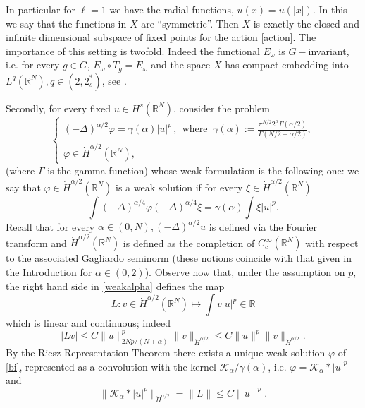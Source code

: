 \documentclass[10pt]{amsart}
\numberwithin{equation}{section}
\begin{document}
\noindent In particular for $\ell =1$ we have the radial functions, $u(x)=u(|x|)$.
In this we say that the functions in $X$ are ``symmetric''.
Then $X$ is exactly  the closed and infinite dimensional subspace of fixed points for the action \eqref{action}.
The importance of this setting is twofold. Indeed
the functional $E_{\omega}$ is $G-$invariant, i.e. for every $g\in G$, $E_{\omega}\circ T_{g}=E_{\omega}$
and the space $X$ has compact embedding into $L^{q}(\mathbb R^{N}), q\in (2,2^{*}_{s})$,
see  \cite{Lions}.
 
\medskip

\noindent Secondly, for every fixed $u\in {H^{s}(\mathbb R^{N})}$, consider the problem
\begin{equation}\label{bi}
\begin{cases}
(-\Delta)^{\alpha/2} \varphi = \gamma(\alpha)|u|^{p}\,, \ \ \text{where } \ \gamma(\alpha):=\frac{\pi^{N/2}2^{\alpha} {\Gamma(\alpha/2)}}{{\Gamma({N}/{2}-{\alpha}/{2})}}, \\
\varphi\in \dot{H}^{\alpha/2}(\mathbb R^{N}),
\end{cases}
\end{equation}
(where $\Gamma$ is the gamma function) whose weak formulation is the following one: we say that $\varphi\in  \dot{H}^{\alpha/2}(\mathbb R^{N})$
is a weak solution if for every $\xi \in \dot{H}^{\alpha/2}(\mathbb R^{N})$
\begin{equation}\label{weakalpha}
\int (-\Delta)^{\alpha/4}\varphi(-\Delta)^{\alpha/4}\xi=\gamma(\alpha)\int \xi |u|^{p}.
\end{equation}
Recall that for every $\alpha\in (0,N),  (-\Delta)^{\alpha/2}u$ is  defined via the Fourier transform and 
$ \dot{H}^{\alpha/2}(\mathbb R^{N})$ is defined as the completion of $C^{\infty}_{c}(\mathbb R^{N})$
with respect to the associated Gagliardo seminorm 
(these notions coincide with that given in the Introduction for $\alpha\in (0,2)$).
Observe now that, under the assumption on $p$,
the right hand side
in \eqref{weakalpha} defines the map 
$$L: v \in \dot{H}^{\alpha/2}(\mathbb R^{N})\mapsto \int v|u|^{p}\in \mathbb R$$
which is linear and continuous; indeed 
$$
|Lv|
\leq  C \| u \|^{p}_{2Np/(N+\alpha)} \|v\|_{\dot{H}^{\alpha/2}}\leq C\|u\|^{p}\|v\|_{\dot{H}^{\alpha/2}}.
$$
By the Riesz Representation Theorem there exists a unique weak solution $\varphi$ of \eqref{bi},
represented as a convolution with the kernel 
$\mathcal K_{\alpha}/\gamma(\alpha)$, i.e. $\varphi=\mathcal K_{\alpha}*|u|^{p}$
and
$$
\|\mathcal K_{\alpha}*|u|^{p} \|_{\dot{H}^{\alpha/2}}=\|L\|\leq C \|u\|^{p}.
$$
\end{document}
